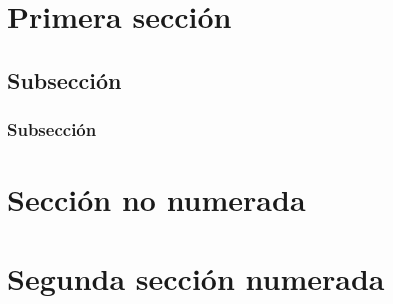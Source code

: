 \section{Primera sección}
\subsection{Subsección}
\subsubsection{Subsección}

\section*{Sección no numerada}
\section{Segunda sección numerada}

